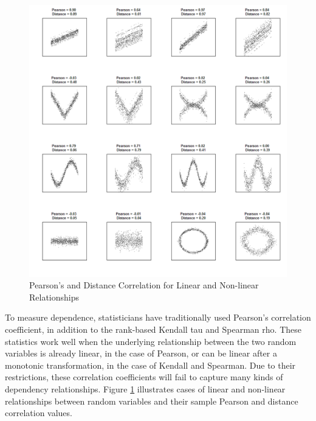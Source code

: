 \begin{figure}
\caption{Pearson's and Distance Correlation for Linear and %
Non-linear Relationships}
\label{nonlinear_depend}
\includegraphics[scale = 0.8]{figs/1_nonlinear_depend.png}
\end{figure}

To measure dependence, statisticians have traditionally used Pearson's
correlation coefficient, in addition to the rank-based Kendall tau and
Spearman rho. These statistics work well when the underlying
relationship between the two random variables is already linear, in the
case of Pearson, or can be linear after a monotonic transformation, in
the case of Kendall and Spearman. Due to their restrictions, these
correlation coefficients will fail to capture many kinds of dependency
relationships. Figure \ref{nonlinear_depend} illustrates cases of
linear and non-linear relationships between random variables and their
sample Pearson and distance correlation values.

